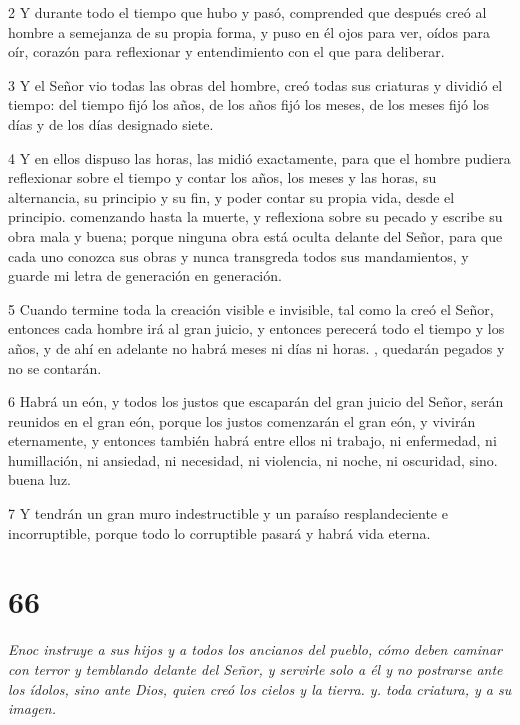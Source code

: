 \par 2 Y durante todo el tiempo que hubo y pasó, comprended que después creó al hombre a semejanza de su propia forma, y ​​puso en él ojos para ver, oídos para oír, corazón para reflexionar y entendimiento con el que para deliberar.

\par 3 Y el Señor vio todas las obras del hombre, creó todas sus criaturas y dividió el tiempo: del tiempo fijó los años, de los años fijó los meses, de los meses fijó los días y de los días designado siete.

\par 4 Y en ellos dispuso las horas, las midió exactamente, para que el hombre pudiera reflexionar sobre el tiempo y contar los años, los meses y las horas, su alternancia, su principio y su fin, y poder contar su propia vida, desde el principio. comenzando hasta la muerte, y reflexiona sobre su pecado y escribe su obra mala y buena; porque ninguna obra está oculta delante del Señor, para que cada uno conozca sus obras y nunca transgreda todos sus mandamientos, y guarde mi letra de generación en generación.

\par 5 Cuando termine toda la creación visible e invisible, tal como la creó el Señor, entonces cada hombre irá al gran juicio, y entonces perecerá todo el tiempo y los años, y de ahí en adelante no habrá meses ni días ni horas. , quedarán pegados y no se contarán.

\par 6 Habrá un eón, y todos los justos que escaparán del gran juicio del Señor, serán reunidos en el gran eón, porque los justos comenzarán el gran eón, y vivirán eternamente, y entonces también habrá entre ellos ni trabajo, ni enfermedad, ni humillación, ni ansiedad, ni necesidad, ni violencia, ni noche, ni oscuridad, sino. buena luz.

\par 7 Y tendrán un gran muro indestructible y un paraíso resplandeciente e incorruptible, porque todo lo corruptible pasará y habrá vida eterna.

\chapter{66}

\par \textit{Enoc instruye a sus hijos y a todos los ancianos del pueblo, cómo deben caminar con terror y temblando delante del Señor, y servirle solo a él y no postrarse ante los ídolos, sino ante Dios, quien creó los cielos y la tierra. y. toda criatura, y a su imagen.}


